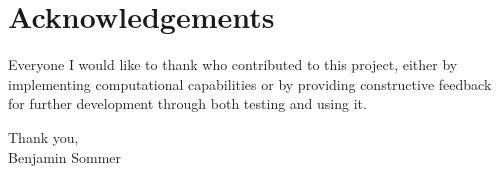 \section*{Acknowledgements}
Everyone I would like to thank who contributed to this project, either by implementing computational capabilities or by providing constructive feedback for further development through both testing and using it.

Thank you,\\
Benjamin Sommer

